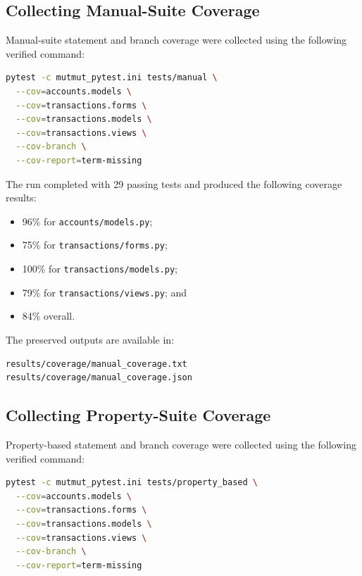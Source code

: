 \documentclass[12pt]{article}
\begin{document}
\subsection{Collecting Manual-Suite Coverage}

Manual-suite statement and branch coverage were collected using the following
verified command:

\begin{lstlisting}[language=bash,caption={Collecting manual-suite coverage}]
pytest -c mutmut_pytest.ini tests/manual \
  --cov=accounts.models \
  --cov=transactions.forms \
  --cov=transactions.models \
  --cov=transactions.views \
  --cov-branch \
  --cov-report=term-missing
\end{lstlisting}

The run completed with 29 passing tests and produced the following coverage
results:

\begin{itemize}
    \item 96\% for \texttt{accounts/models.py};
    \item 75\% for \texttt{transactions/forms.py};
    \item 100\% for \texttt{transactions/models.py};
    \item 79\% for \texttt{transactions/views.py}; and
    \item 84\% overall.
\end{itemize}

The preserved outputs are available in:

\begin{verbatim}
results/coverage/manual_coverage.txt
results/coverage/manual_coverage.json
\end{verbatim}

\subsection{Collecting Property-Suite Coverage}

Property-based statement and branch coverage were collected using the following
verified command:

\begin{lstlisting}[language=bash,caption={Collecting property-based coverage}]
pytest -c mutmut_pytest.ini tests/property_based \
  --cov=accounts.models \
  --cov=transactions.forms \
  --cov=transactions.models \
  --cov=transactions.views \
  --cov-branch \
  --cov-report=term-missing
\end{lstlisting}
\end{document}
